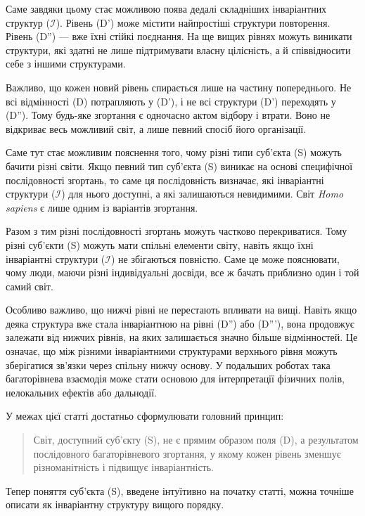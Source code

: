 \documentclass[aps,prd,onecolumn,nofootinbib,superscriptaddress]{revtex4-2} %
\begin{document}
    Саме завдяки цьому стає можливою поява дедалі складніших інваріантних структур ($\mathcal{I}$). Рівень (D') може містити найпростіші структури повторення. Рівень (D'') — вже їхні стійкі поєднання. На ще вищих рівнях можуть виникати структури, які здатні не лише підтримувати власну цілісність, а й співвідносити себе з іншими структурами.

    Важливо, що кожен новий рівень спирається лише на частину попереднього. Не всі відмінності (D) потрапляють у (D'), і не всі структури (D') переходять у (D''). Тому будь-яке згортання є одночасно актом відбору і втрати. Воно не відкриває весь можливий світ, а лише певний спосіб його організації.

    Саме тут стає можливим пояснення того, чому різні типи суб’єкта (S) можуть бачити різні світи. Якщо певний тип суб’єкта (S) виникає на основі специфічної послідовності згортань, то саме ця послідовність визначає, які інваріантні структури ($\mathcal{I}$) для нього доступні, а які залишаються невидимими. Світ \emph{Homo sapiens} є лише одним із варіантів згортання.

    Разом з тим різні послідовності згортань можуть частково перекриватися. Тому різні суб’єкти (S) можуть мати спільні елементи світу, навіть якщо їхні інваріантні структури ($\mathcal{I}$) не збігаються повністю. Саме це може пояснювати, чому люди, маючи різні індивідуальні досвіди, все ж бачать приблизно один і той самий світ.

    Особливо важливо, що нижчі рівні не перестають впливати на вищі. Навіть якщо деяка структура вже стала інваріантною на рівні (D'') або (D'''), вона продовжує залежати від нижчих рівнів, на яких залишається значно більше відмінностей. Це означає, що між різними інваріантними структурами верхнього рівня можуть зберігатися зв’язки через спільну нижчу основу. У подальших роботах така багаторівнева взаємодія може стати основою для інтерпретації фізичних полів, нелокальних ефектів або дальнодії.

    У межах цієї статті достатньо сформулювати головний принцип:

    \begin{quote}
        Світ, доступний суб’єкту (S), не є прямим образом поля (D), а результатом послідовного багаторівневого згортання, у якому кожен рівень зменшує різноманітність і підвищує інваріантність.
    \end{quote}

    Тепер поняття суб’єкта (S), введене інтуїтивно на початку статті, можна точніше описати як інваріантну структуру вищого порядку.
\end{document}
